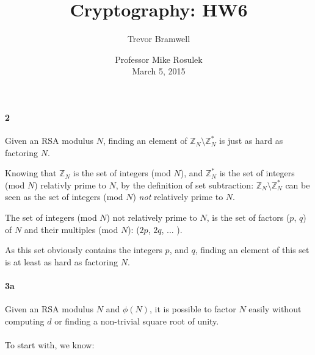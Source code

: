 \documentclass[12pt]{article}
\title{Cryptography: HW6}
\author{Trevor Bramwell}
\date{
    Professor Mike Rosulek\\
    March 5, 2015
}
\begin{document}
\maketitle

%
%
%
%

\paragraph{2}

Given an RSA modulus $N$, finding an element of $\mathbb{Z}_N \setminus
\mathbb{Z}_{N}^*$ is just as hard as factoring $N$.

Knowing that $\mathbb{Z}_N$ is the set of integers (mod $N$), and
$\mathbb{Z}_{N}^*$ is the set of integers (mod $N$) relativly prime to
$N$, by the definition of set subtraction: $\mathbb{Z}_N \setminus
\mathbb{Z}_{N}^*$ can be seen as the set of integers (mod $N$) {\it not}
relatively prime to $N$.

The set of integers (mod $N$) not relatively prime to $N$, is the set of
factors ($p$, $q$) of $N$ and their multiples (mod $N$): ($2p$, $2q$, ... ).

As this set obviously contains the integers $p$, and $q$, finding an
element of this set is at least as hard as factoring $N$.

\paragraph{3a}

Given an RSA modulus $N$ and $\phi{(N)}$, it is possible to factor $N$
easily without computing $d$ or finding a non-trivial square root of
unity.
\\\\
To start with, we know:
\end{document}
